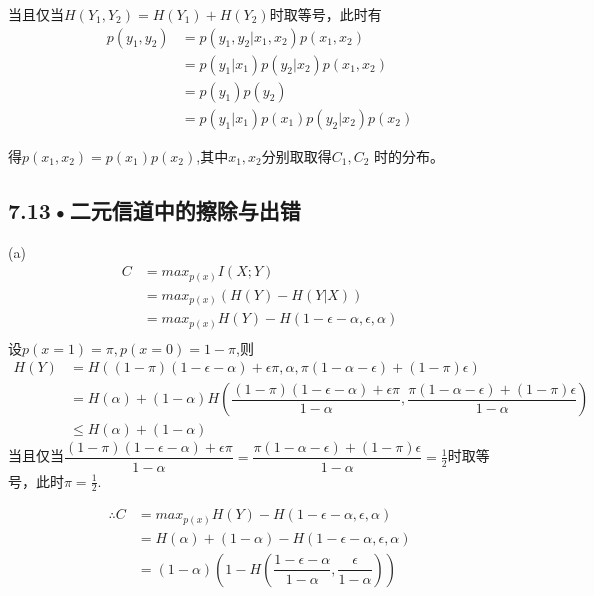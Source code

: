 \documentclass[UTF8]{ctexart}
\begin{document}
当且仅当$H(Y_1,Y_2)= H(Y_1)+H(Y_2)$时取等号，此时有
\begin{equation*}
    \begin{split}
        p(y_1,y_2)&=p(y_1,y_2|x_1,x_2)p(x_1,x_2)\\
        &=p(y_1|x_1)p(y_2|x_2)p(x_1,x_2)\\
        &=p(y_1)p(y_2)\\
        &=p(y_1|x_1)p(x_1)p(y_2|x_2)p(x_2)
    \end{split}
\end{equation*}

得$p(x_1,x_2)=p(x_1)p(x_2)$,其中$x_1,x_2$分别取取得$C_1,C_2$ 时的分布。
\subsection*{7.13•二元信道中的擦除与出错}
(a)\begin{equation*}
    \begin{split}
        C &= max_{p(x)}I(X;Y)\\
        &= max_{p(x)}(H(Y)-H(Y|X))\\
        &= max_{p(x)}H(Y)-H(1-\epsilon-\alpha, \epsilon, \alpha)\\
    \end{split}
\end{equation*}
设$p(x=1)=\pi, p(x=0)=1-\pi$,则
\begin{equation*}
    \begin{split}
        H(Y) &= H((1-\pi)(1-\epsilon-\alpha)+\epsilon\pi, \alpha, \pi(1-\alpha-\epsilon)+(1-\pi)\epsilon)\\
        &= H(\alpha) + (1-\alpha)H(\dfrac{(1-\pi)(1-\epsilon-\alpha)+\epsilon\pi}{1-\alpha},\dfrac{\pi(1-\alpha-\epsilon)+(1-\pi)\epsilon}{1-\alpha})\\
        &\leqslant H(\alpha)+(1-\alpha)
    \end{split}
\end{equation*}
当且仅当$\dfrac{(1-\pi)(1-\epsilon-\alpha)+\epsilon\pi}{1-\alpha}=\dfrac{\pi(1-\alpha-\epsilon)+(1-\pi)\epsilon}{1-\alpha}=\frac{1}{2}$时取等号，此时$ \pi=\frac{1}{2}$.

\begin{equation*}
    \begin{split}
        \therefore C &= max_{p(x)}H(Y)-H(1-\epsilon-\alpha, \epsilon, \alpha)\\
        &= H(\alpha)+(1-\alpha)-H(1-\epsilon-\alpha, \epsilon, \alpha)\\
        &= (1-\alpha)(1-H(\dfrac{1-\epsilon-\alpha}{1-\alpha},\dfrac{\epsilon}{1-\alpha}))
    \end{split}
\end{equation*}
\end{document}
